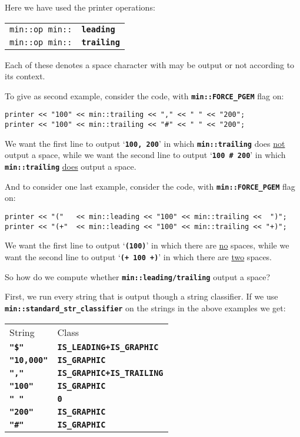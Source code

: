 \documentclass[12pt]{article}
\makeatletter
\newcommand{\TT}[1]{{\tt \bfseries #1}}
\newcommand{\ttindex}[1]{\index{#1@{\tt #1}}}
\newcommand{\EOL}{\penalty \exhyphenpenalty}
\newenvironment{indpar}[1][0.3in]%
	{\begin{list}{}%
		     {\setlength{\itemsep}{0in}%
		      \setlength{\topsep}{0in}%
		      \setlength{\parsep}{1ex}%
		      \setlength{\labelwidth}{#1}%
		      \setlength{\leftmargin}{#1}%
		      \addtolength{\leftmargin}{\labelsep}}%
	 \item}%
	{\end{list}}
\newcommand{\LABEL}[1]{\label{#1}}
\newcommand{\MINKEY}[1]%
	   {\TT{#1}\ttindex{min::#1}\ttindex{#1}}
\makeatother
\begin{document}
Here we have used the printer operations:

\begin{indpar}[1em]\begin{tabular}{r@{}l}
\verb|min::op min::| & \MINKEY{leading}
\LABEL{MIN::LEADING} \\
\verb|min::op min::| & \MINKEY{trailing}
\LABEL{MIN::TRAILING} \\
\end{tabular}\end{indpar}

Each of these denotes a space character with may be output or
not according to its context.

To give as second example,
consider the code, with \TT{min::\EOL FORCE\_\EOL PGEM} flag on:
\begin{indpar}\begin{verbatim}
printer << "100" << min::trailing << "," << " " << "200";
printer << "100" << min::trailing << "#" << " " << "200";
\end{verbatim}\end{indpar}

We want the first line to output `\TT{100, 200}' in which
\TT{min::\EOL trailing} does \underline{not} output a space,
while we want the second line to output `\TT{100 \# 200}'
in which \TT{min::\EOL trailing} \underline{does} output a space.

And to consider one last example,
consider the code, with \TT{min::\EOL FORCE\_\EOL PGEM} flag on:
\begin{indpar}\begin{verbatim}
printer << "("   << min::leading << "100" << min::trailing <<  ")";
printer << "(+"  << min::leading << "100" << min::trailing << "+)";
\end{verbatim}\end{indpar}

We want the first line to output `\TT{(100)}' in which there are
\underline{no} spaces,
while we want the second line to output `\TT{(+ 100 +)}'
in which there are \underline{two} spaces.

So how do we compute whether \TT{min::leading/trailing} output
a space? 

First, we run every string that is output though a string classifier.
If we use \TT{min::\EOL standard\_\EOL str\_\EOL classifier} on the
strings in the above examples we get:

\begin{center}
\begin{tabular}{l@{~~~~~}l}
String & Class \\[2ex]
\TT{"\$"} & \TT{IS\_LEADING+IS\_GRAPHIC} \\
\TT{"10,000"} & \TT{IS\_GRAPHIC} \\
\TT{","} & \TT{IS\_GRAPHIC+IS\_TRAILING} \\
\TT{"100"} & \TT{IS\_GRAPHIC} \\
\TT{"~"} & \TT{0} \\
\TT{"200"} & \TT{IS\_GRAPHIC} \\
\TT{"\#"} & \TT{IS\_GRAPHIC} \\
\end{tabular}
\end{center}
\end{document}
